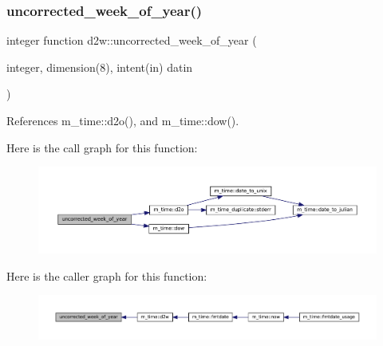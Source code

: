 \subsubsection{\texorpdfstring{uncorrected\+\_\+week\+\_\+of\+\_\+year()}{uncorrected\_week\_of\_year()}}
{\footnotesize\ttfamily integer function d2w\+::uncorrected\+\_\+week\+\_\+of\+\_\+year (\begin{DoxyParamCaption}\item[{integer, dimension(8), intent(in)}]{datin }\end{DoxyParamCaption})\hspace{0.3cm}{\ttfamily [private]}}



References m\+\_\+time\+::d2o(), and m\+\_\+time\+::dow().

Here is the call graph for this function\+:\nopagebreak
\begin{figure}[H]
\begin{center}
\leavevmode
\includegraphics[width=350pt]{M__time_8f90_a4a68c5e906616f64da0c3d165fc41479_cgraph}
\end{center}
\end{figure}
Here is the caller graph for this function\+:\nopagebreak
\begin{figure}[H]
\begin{center}
\leavevmode
\includegraphics[width=350pt]{M__time_8f90_a4a68c5e906616f64da0c3d165fc41479_icgraph}
\end{center}
\end{figure}
